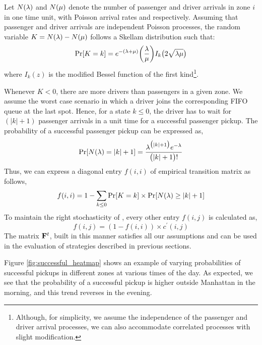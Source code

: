 Let $N(\lambda)$ and $N(\mu)$ denote the number of passenger and driver arrivals in zone $i$ in one time unit, with Poisson arrival rates {\passengerarrivalrate} and {\driverarrivalrate} respectively. Assuming that passenger and driver arrivals are independent Poisson processes, the random variable $K = N(\lambda) - N(\mu)$ follows a Skellam distribution 
such that:
\begin{equation}
\Pr[K=k] = e^{-(\lambda + \mu)} \bigg(\frac{\lambda}{\mu}\bigg) I_k\big(2 \sqrt{\lambda \mu}\big)
\end{equation}
where $I_k(z)$ is the modified Bessel function of the first kind\footnote{Although, for simplicity, we assume the independence of the passenger and driver arrival processes, we can also accommodate correlated processes with slight modification.}.

Whenever %
$K<0$, there are more drivers than passengers in a given zone. We assume the worst case scenario in which a driver joins the corresponding FIFO queue at the last spot. Hence, for a state $k \leq 0$, the driver has to wait for $(|k| + 1)$ passenger arrivals in a unit time for a successful passenger pickup. The probability of a successful passenger pickup can be expressed as,
\begin{equation}
\Pr[N(\lambda) = |k| + 1] = \frac{\lambda^{\big(|k|+1\big)} e^{-\lambda}}{\big(|k| + 1\big)!}
\end{equation}
Thus, we can express a diagonal entry $f(i,i)$ of empirical transition matrix as follows,
\begin{equation}
f(i,i) = 1 - \sum_{k \leq 0} \Pr[K = k] \times \Pr[N(\lambda) \geq |k| + 1]
\end{equation}
To maintain the right stochasticity of {\empiricaltransitionmatrix}, every other entry $f(i,j)$ is calculated as,
\begin{equation}
f(i,j) = (1 - f(i,i)) \times c^\prime(i,j)
\end{equation}
The matrix ${\mathbf{F}}^t$, built in this manner satisfies all our assumptions and can be used in the evaluation of strategies described in previous sections. 

Figure \ref{fig:successful_heatmap} shows an example of varying probabilities of successful pickups in different zones at various times of the day. As expected, we see that the probability of a successful pickup is higher outside Manhattan in the morning, and this trend reverses in the evening.

